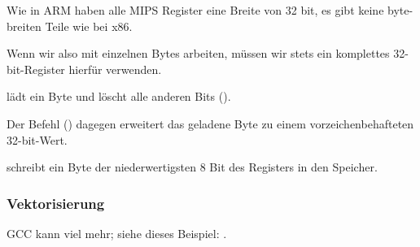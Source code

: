 Wie in ARM haben alle MIPS Register eine Breite von 32 bit, es gibt keine
byte-breiten Teile wie bei x86.

Wenn wir also mit einzelnen Bytes arbeiten, müssen wir stets ein komplettes
32-bit-Register hierfür verwenden.

 lädt ein Byte und löscht alle anderen Bits ().

Der Befehl  () dagegen erweitert das geladene Byte zu einem
vorzeichenbehafteten 32-bit-Wert.

 schreibt ein Byte der niederwertigsten 8 Bit des Registers in den
Speicher.


\subsubsection{Vektorisierung}

\Optimizing GCC kann viel mehr; siehe dieses Beispiel: .
